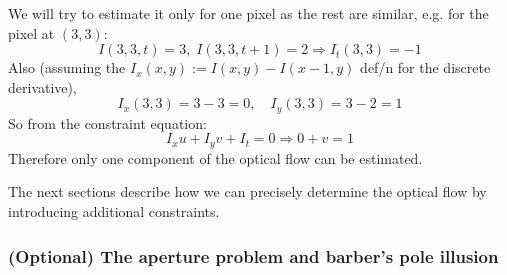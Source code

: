 \documentclass[a4paper]{article}
\begin{document}
\begin{soln}
We will try to estimate it only for one pixel as the rest are similar, e.g. for the pixel at $(3,3)$:
\[
I(3,3,t) = 3, \; I(3,3,t+1) = 2 \Rightarrow I_t(3,3) = -1
\]
Also (assuming the $I_x(x,y) := I(x,y) - I(x-1,y)$ def/n for the discrete derivative), 
\[
I_x(3,3) = 3-3=0, \quad I_y(3,3) = 3-2=1
\]
So from the constraint equation:
\[
I_xu + I_yv + I_t = 0 \Rightarrow 0 + v = 1
\]
Therefore only one component of the optical flow can be estimated.
\end{soln}


The next sections describe how we can precisely determine the optical flow by introducing additional constraints.



\subsubsection{(Optional) The aperture problem and barber's pole illusion}
\end{document}
